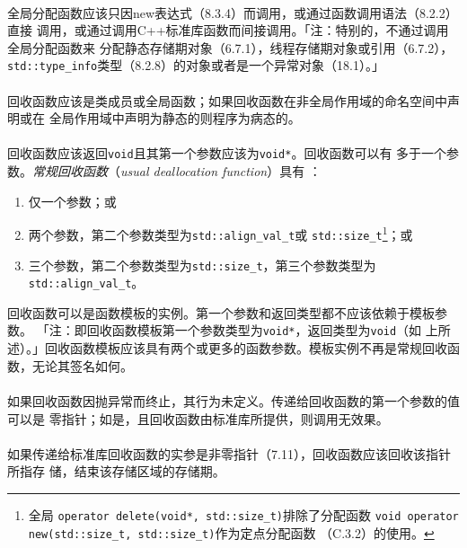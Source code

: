 \paragraph{}
全局分配函数应该只因new表达式（8.3.4）而调用，或通过函数调用语法（8.2.2）直接
调用，或通过调用C++标准库函数而间接调用。「注：特别的，不通过调用全局分配函数来
分配静态存储期对象（6.7.1），线程存储期对象或引用（6.7.2），
\texttt{std::type\_info}类型（8.2.8）的对象或者是一个异常对象（18.1）。」

\paragraph{}
回收函数应该是类成员或全局函数；如果回收函数在非全局作用域的命名空间中声明或在
全局作用域中声明为静态的则程序为病态的。

\paragraph{}
回收函数应该返回\texttt{void}且其第一个参数应该为\texttt{void*}。回收函数可以有
多于一个参数。\textit{常规回收函数}（\textit{usual deallocation function}）具有
：
\begin{enumerate}
  \item{仅一个参数；或}
  \item{两个参数，第二个参数类型为\texttt{std::align\_val\_t}或
      \texttt{std::size\_t}\footnote{全局
      \texttt{operator delete(void*, std::size\_t)}排除了分配函数
      \texttt{void operator new(std::size\_t, std::size\_t)}作为定点分配函数
      （C.3.2）的使用。}；或}
  \item{三个参数，第二个参数类型为\texttt{std::size\_t}，第三个参数类型为
      \texttt{std::align\_val\_t}。}
\end{enumerate}
回收函数可以是函数模板的实例。第一个参数和返回类型都不应该依赖于模板参数。
「注：即回收函数模板第一个参数类型为\texttt{void*}，返回类型为\texttt{void}（如
上所述）。」回收函数模板应该具有两个或更多的函数参数。模板实例不再是常规回收函
数，无论其签名如何。

\paragraph{}
如果回收函数因抛异常而终止，其行为未定义。传递给回收函数的第一个参数的值可以是
零指针；如是，且回收函数由标准库所提供，则调用无效果。

\paragraph{}
如果传递给标准库回收函数的实参是非零指针（7.11），回收函数应该回收该指针所指存
储，结束该存储区域的存储期。

